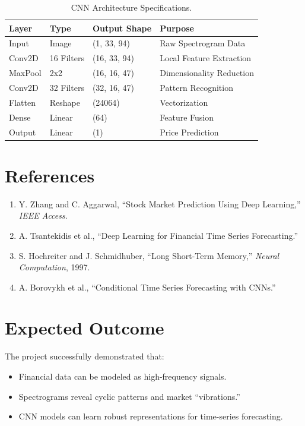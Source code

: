 \documentclass[12pt,a4paper]{article}
\begin{document}
\begin{table}[h!]
\centering
\begin{tabular}{@{}llll@{}}
\toprule
\textbf{Layer} & \textbf{Type} & \textbf{Output Shape} & \textbf{Purpose} \\ \midrule
Input & Image & (1, 33, 94) & Raw Spectrogram Data \\
Conv2D & 16 Filters & (16, 33, 94) & Local Feature Extraction \\
MaxPool & 2x2 & (16, 16, 47) & Dimensionality Reduction \\
Conv2D & 32 Filters & (32, 16, 47) & Pattern Recognition \\
Flatten & Reshape & (24064) & Vectorization \\
Dense & Linear & (64) & Feature Fusion \\
Output & Linear & (1) & Price Prediction \\ \bottomrule
\end{tabular}
\caption{CNN Architecture Specifications.}
\end{table}

\section{References}
\begin{enumerate}
    \item Y. Zhang and C. Aggarwal, ``Stock Market Prediction Using Deep Learning,'' \textit{IEEE Access}.
    \item A. Tsantekidis et al., ``Deep Learning for Financial Time Series Forecasting.''
    \item S. Hochreiter and J. Schmidhuber, ``Long Short-Term Memory,'' \textit{Neural Computation}, 1997.
    \item A. Borovykh et al., ``Conditional Time Series Forecasting with CNNs.''
\end{enumerate}

\section{Expected Outcome}
The project successfully demonstrated that:
\begin{itemize}
    \item Financial data can be modeled as high-frequency signals.
    \item Spectrograms reveal cyclic patterns and market ``vibrations.''
    \item CNN models can learn robust representations for time-series forecasting.
\end{itemize}
\end{document}
